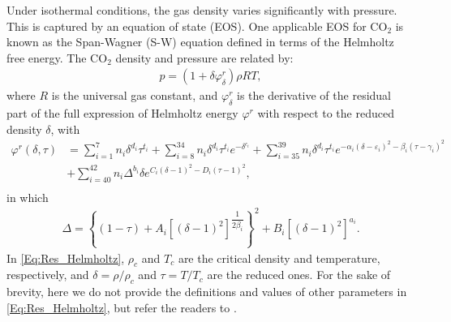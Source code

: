 Under isothermal conditions, the gas density varies significantly with pressure. This is {captured} by an equation of state (EOS). One applicable EOS for CO$_2$ is known as the Span-Wagner (S-W) equation \cite{span1996new} defined in terms of the Helmholtz free energy. The CO$_2$ density and pressure are related by:
\begin{equation}\label{Eq:Density_Pressure}
    \begin{aligned}
        p=\left(1+\delta\varphi^r_{\delta}\right)\rho RT,
    \end{aligned}
\end{equation}
where $R$ is the universal gas constant, and $\varphi^r_{\delta}$ is the derivative of the residual part of the full expression of Helmholtz energy $\varphi^r$ with respect to the reduced density $\delta$, with %
\begin{equation}\label{Eq:Res_Helmholtz}
    \begin{aligned}
        \varphi^r\left(\delta,\tau\right) &= \sum_{i=1}^{7} n_i  \delta^{d_i}\tau^{t_i}+\sum_{i=8}^{34} n_i\delta^{d_i} \tau^{t_i} e^{-\delta^{c_i}}+ \sum_{i=35}^{39} n_i  \delta^{d_i}\tau^{t_i} e^{-\alpha_i\left(\delta-\varepsilon_i \right)^2-\beta_i\left(\tau-\gamma_i\right)^2}\\ &+\sum_{i=40}^{42} n_i\Delta^{b_i}\delta e^{C_i\left(\delta-1\right)^2-D_i\left(\tau-1\right) ^2},\\
    \end{aligned}
\end{equation}
in which
\begin{equation*}\label{Eq:Delta}
    \begin{aligned}
        \Delta=\left\lbrace\left(1-\tau \right)+A_i\left[\left(\delta-1 \right)^2\right]^{\dfrac{1}{2\beta_i}}\right\rbrace ^2+B_i\left[\left(\delta-1 \right)^2\right]^{a_i}.
    \end{aligned}
\end{equation*}
In \eqref{Eq:Res_Helmholtz}, $\rho_c$ and $T_c$ are the critical density and temperature, respectively, and $\delta=\rho/\rho_c$ and $\tau=T/T_c$ are the reduced ones. For the sake of brevity, here we do not provide the definitions and values of other parameters in \eqref{Eq:Res_Helmholtz}, but refer the readers to \cite{span1996new}.


